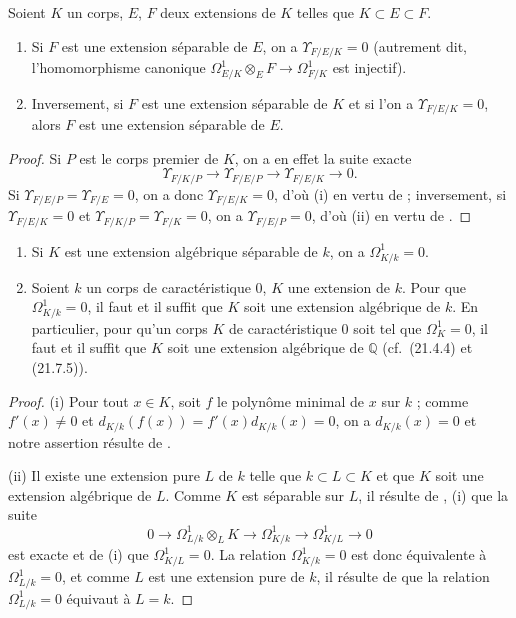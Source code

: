\begin{corollary}[20.6.19]
\label{0.20.6.19-fr}
Soient $K$ un corps, $E$, $F$ deux extensions de $K$ telles que
$K\subset E\subset F$.
\begin{enumerate}
  \item[\rm(i)] Si $F$ est une extension séparable de $E$, on a
  $\Upsilon_{F/E/K}=0$ (autrement dit, l'homomorphisme canonique
  $\Omega^1_{E/K}\otimes_E F\to\Omega^1_{F/K}$ est injectif).
  \item[\rm(ii)] Inversement, si $F$ est une extension séparable de $K$ et
  si l'on a $\Upsilon_{F/E/K}=0$, alors $F$ est une extension séparable de
  $E$.
\end{enumerate}
\end{corollary}

\begin{proof}
Si $P$ est le corps premier de $K$, on a en effet la suite exacte
\[
  \Upsilon_{F/K/P}\to\Upsilon_{F/E/P}\to\Upsilon_{F/E/K}\to0.
\]
Si $\Upsilon_{F/E/P}=\Upsilon_{F/E}=0$, on a donc
$\Upsilon_{F/E/K}=0$, d'où (i) en vertu de  ;
inversement, si $\Upsilon_{F/E/K}=0$ et
$\Upsilon_{F/K/P}=\Upsilon_{F/K}=0$, on a
$\Upsilon_{F/E/P}=0$, d'où (ii) en vertu de .
\end{proof}

\begin{corollary}[20.6.20]
\label{0.20.6.20-fr}
\begin{enumerate}
  \item[\rm(i)] Si $K$ est une extension algébrique séparable de $k$, on a
  $\Omega^1_{K/k}=0$.
  \item[\rm(ii)] Soient $k$ un corps de caractéristique 0, $K$ une extension
  de $k$. Pour que $\Omega^1_{K/k}=0$, il faut et il suffit que $K$ soit une
  extension algébrique de $k$. En particulier, pour qu'un corps $K$ de
  caractéristique 0 soit tel que $\Omega^1_K=0$, il faut et il suffit que
  $K$ soit une extension algébrique de $\mathbb{Q}$ (cf.\ (21.4.4) et
  (21.7.5)).
\end{enumerate}
\end{corollary}

\begin{proof}
(i) Pour tout $x\in K$, soit $f$ le polynôme minimal de $x$ sur $k$ ; comme
$f'(x)\ne0$ et $d_{K/k}(f(x))=f'(x)d_{K/k}(x)=0$, on a
$d_{K/k}(x)=0$ et notre assertion résulte de .

(ii) Il existe une extension pure $L$ de $k$ telle que
$k\subset L\subset K$ et que $K$ soit une extension algébrique de $L$.
Comme $K$ est séparable sur $L$, il résulte de , (i) que
la suite 
\[
  0\to\Omega^1_{L/k}\otimes_L K\to\Omega^1_{K/k}
  \to\Omega^1_{K/L}\to0
\]
est exacte et de (i) que $\Omega^1_{K/L}=0$. La relation
$\Omega^1_{K/k}=0$ est donc équivalente à $\Omega^1_{L/k}=0$, et comme
$L$ est une extension pure de $k$, il résulte de  que
la relation $\Omega^1_{L/k}=0$ équivaut à $L=k$.
\end{proof}


